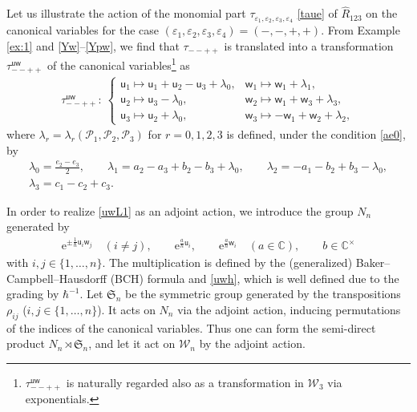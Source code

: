 \documentclass[11pt]{article}
\numberwithin{equation}{section}
\newcommand{\C}{{\mathbb C}}
\newcommand{\e}{{\mathrm e}}
\newcommand{\uu}{{\mathsf u}}
\newcommand{\ww}{{\mathsf w}}
\numberwithin{equation}{section}
\begin{document}
Let us illustrate the action of the monomial part
$\tau_{\varepsilon_1, \varepsilon_2, \varepsilon_3, \varepsilon_4}$
 \eqref{taue} of $\widehat{R}_{123}$ on the canonical variables for the case
 $(\varepsilon_1, \varepsilon_2, \varepsilon_3, \varepsilon_4) = (-,-,+,+)$.
 From Example \ref{ex:1} and \eqref{Yw}--\eqref{Ypw}, we find that
$\tau_{--++}$ is translated into a transformation $\tau^{\uu\ww}_{--++}$
of the canonical variables\footnote{$\tau^{\uu\ww}_{--++}$ is naturally regarded also as
a transformation in $\mathcal{W}_3$ via exponentials.} as
\begin{align}
\tau^{\uu\ww}_{--++}\colon\
\begin{cases}
\uu_1 \mapsto \uu_1+\uu_2-\uu_3+\lambda_0,
&
\ww_1 \mapsto \ww_1+ \lambda_1,
\\
\uu_2 \mapsto \uu_3-\lambda_0,
&
\ww_2 \mapsto \ww_1+\ww_3+\lambda_3,
\\
\uu_3 \mapsto \uu_2+\lambda_0,
&
\ww_3 \mapsto -\ww_1+\ww_2+\lambda_2,
\end{cases}
\label{uwL1}
\end{align}
where $\lambda_r=\lambda_r(\mathscr{P}_1,\mathscr{P}_2,\mathscr{P}_3)$
for $r=0, 1, 2, 3$ is defined, under the condition \eqref{ae0},
by
\begin{gather}
\lambda_0 = \frac{e_2-e_3}{2},\qquad
\lambda_1 = a_2-a_3+b_2-b_3 + \lambda_0,\qquad
\lambda_2 = -a_1-b_2+b_3-\lambda_0,\nonumber\\
\lambda_3 = c_1-c_2+c_3.\label{lad}
\end{gather}

In order to realize \eqref{uwL1} as an adjoint action, we introduce
the group $N_n$ generated by
\begin{gather*}
\e^{\pm \tfrac{1}{\hbar}\uu_i\ww_j}\quad (i \neq j),\qquad
\e^{ \tfrac{a}{\hbar}\uu_i}, \qquad \e^{ \tfrac{a}{\hbar}\ww_i}  \quad (a \in \C) ,\qquad b \in \C^\times
\end{gather*}
with $i, j\in \{1,\dotsc, n\}$. The multiplication is defined by
the (generalized) Baker--Campbell--Hausdorff (BCH) formula and
\eqref{uwh}, which is well defined due to the grading by $\hbar^{-1}$.
Let $\mathfrak{S}_n$ be the symmetric group generated by the
transpositions $\rho_{ij}$ ($i, j \in \{1,\dotsc, n\}$). It acts on
$N_n$ via the adjoint action, inducing permutations of the indices of
the canonical variables. Thus one can form the semi-direct product
$N_n \rtimes \mathfrak{S}_n$, and let it act on $\mathcal{W}_n$ by the
adjoint action.
\end{document}
